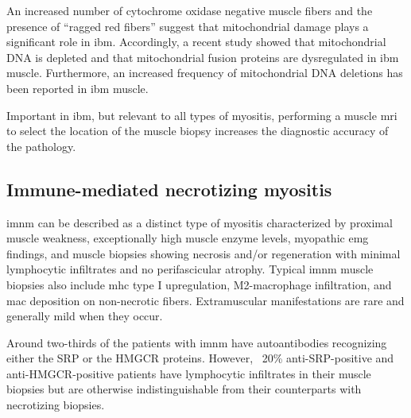 An increased number of cytochrome oxidase negative muscle fibers and the presence of “ragged red fibers” suggest that mitochondrial damage plays a significant role in \gls{ibm}.\cite{Dalakas2002} Accordingly, a recent study showed that mitochondrial DNA is depleted and that mitochondrial fusion proteins are dysregulated in \gls{ibm} muscle.\cite{CatalanGarcia2016} Furthermore, an increased frequency of mitochondrial DNA deletions has been reported in \gls{ibm} muscle.\cite{Rygiel2016}

Important in \gls{ibm}, but relevant to all types of myositis, performing a muscle \gls{mri} to select the location of the muscle biopsy increases the diagnostic accuracy of the pathology.\cite{VanDeVlekkert2015}

\subsection{Immune-mediated necrotizing myositis}

\gls{imnm} can be described as a distinct type of myositis characterized by proximal muscle weakness, exceptionally high muscle enzyme levels, myopathic \gls{emg} findings, and muscle biopsies showing necrosis and/or regeneration with minimal lymphocytic infiltrates and no perifascicular atrophy. Typical \gls{imnm} muscle biopsies also include \gls{mhc} type I upregulation, M2-macrophage infiltration, and \gls{mac} deposition on non-necrotic fibers.\cite{Watanabe2016,Chung2015} Extramuscular manifestations are rare and generally mild when they occur.\cite{PinalFernandez2017b,Suzuki2015,Tiniakou2017}

Around two-thirds of the patients with \gls{imnm} have autoantibodies recognizing either the SRP or the HMGCR proteins. However, ~20\% anti-SRP-positive and anti-HMGCR-positive patients have lymphocytic infiltrates in their muscle biopsies but are otherwise indistinguishable from their counterparts with necrotizing biopsies.\cite{Suzuki2015,Mammen2011,Allenbach2018}

